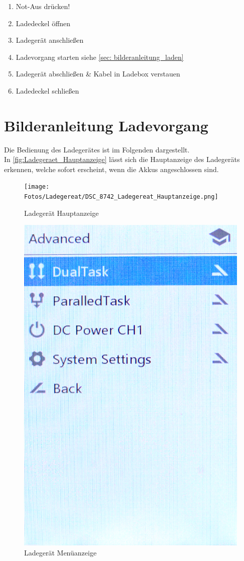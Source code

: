 \begin{enumerate}
    \item Not-Aus drücken!
    \item Ladedeckel öffnen
    \item Ladegerät anschließen
    \item Ladevorgang starten siehe \ref{sec: bilderanleitung_laden}
    \item Ladegerät abschließen \& Kabel in Ladebox verstauen
    \item Ladedeckel schließen
\end{enumerate}

\newpage
\section{Bilderanleitung Ladevorgang \label{sec: bilderanleitung_laden}}
Die Bedienung des Ladegerätes ist im Folgenden dargestellt. \\

In \autoref{fig:Ladegeraet_Hauptanzeige} lässt sich die Hauptanzeige des Ladegeräts erkennen, welche 
sofort erscheint, wenn die Akkus angeschlossen sind. 


\begin{figure}[H]
    \centering
    \texttt{[image: Fotos/Ladegereat/DSC\_8742\_Ladegereat\_Hauptanzeige.png]}
    \caption{Ladegerät Hauptanzeige \label{fig:Ladegeraet_Hauptanzeige}}
\end{figure}

\begin{figure}[H]
    \centering
    \includegraphics[width=.35\textwidth]{Fotos/Ladegereat/DSC_8744_Lademenue.png}
    \caption{Ladegerät Menüanzeige}
\end{figure}

